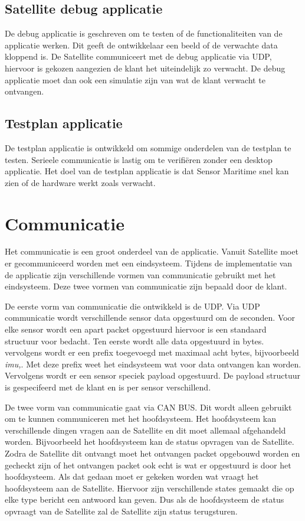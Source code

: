 \subsection{Satellite debug applicatie}
De debug applicatie is geschreven om te testen of de functionaliteiten van de applicatie werken. Dit geeft de ontwikkelaar een beeld of de verwachte data kloppend is. De Satellite communiceert met de debug applicatie via UDP, hiervoor is gekozen aangezien de klant het uiteindelijk zo verwacht. De debug applicatie moet dan ook een simulatie zijn van wat de klant verwacht te ontvangen.

\subsection{Testplan applicatie}
De testplan applicatie is ontwikkeld om sommige onderdelen van de testplan te testen. Serieele communicatie is lastig om te verifiëren zonder een desktop applicatie. Het doel van de testplan applicatie is dat Sensor Maritime snel kan zien of de hardware werkt zoals verwacht.

\section{Communicatie}
Het communicatie is een groot onderdeel van de applicatie. Vanuit Satellite moet er gecommuniceerd worden met een eindsysteem. Tijdens de implementatie van de applicatie zijn verschillende vormen van communicatie gebruikt met het eindsysteem. Deze twee vormen van communicatie zijn bepaald door de klant. \newline

\noindent De eerste vorm van communicatie die ontwikkeld is de UDP. Via UDP communicatie wordt verschillende sensor data opgestuurd om de seconden. Voor elke sensor wordt een apart packet opgestuurd hiervoor is een standaard structuur voor bedacht. Ten eerste wordt alle data opgestuurd in bytes. vervolgens wordt er een prefix toegevoegd met maximaal acht bytes, bijvoorbeeld \textit{imu,}. Met deze prefix weet het eindsysteem wat voor data ontvangen kan worden. Vervolgens wordt er een sensor speciek payload opgestuurd. De payload structuur is gespecifeerd met de klant en is per sensor verschillend. \newline

\noindent De twee vorm van communicatie gaat via CAN BUS. Dit wordt alleen gebruikt om te kunnen communiceren met het hoofdsysteem. Het hoofdsysteem kan verschillende dingen vragen aan de Satellite en dit moet allemaal afgehandeld worden. Bijvoorbeeld het hoofdsysteem kan de status opvragen van de Satellite. Zodra de Satellite dit ontvangt moet het ontvangen packet opgebouwd worden en gecheckt zijn of het ontvangen packet ook echt is wat er opgestuurd is door het hoofdsysteem. Als dat gedaan moet er gekeken worden wat vraagt het hoofdsysteem aan de Satellite. Hiervoor zijn verschillende states gemaakt die op elke type bericht een antwoord kan geven. Dus als de hoofdsysteem de status opvraagt van de Satellite zal de Satellite zijn status terugsturen.


